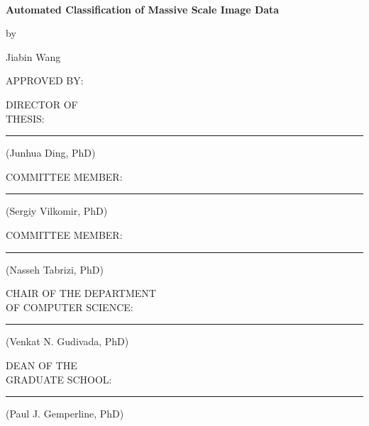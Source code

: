 
\hbox{\ }
\thispagestyle{empty}
\renewcommand{\baselinestretch}{2}
\small \normalsize
\begin{center}
\textbf{Automated Classification of Massive Scale Image Data}
\end{center}
\begin{center}
by
\end{center}
\begin{center}
Jiabin Wang
\end{center}
 
\begin{flushleft}
APPROVED BY:
\end{flushleft}
DIRECTOR OF\\ 
THESIS:
\noindent\rule{14cm}{0.4pt}
\begin{flushright}
\renewcommand{\baselinestretch}{0}
\small\normalsize
(Junhua Ding, PhD)
\end{flushright}
COMMITTEE MEMBER: 
\noindent\rule{10.75cm}{0.4pt}
\begin{flushright}
\renewcommand{\baselinestretch}{0}
\small\normalsize
(Sergiy Vilkomir, PhD)
\end{flushright}
COMMITTEE MEMBER: 
\noindent\rule{10.75cm}{0.4pt}
\begin{flushright}
\renewcommand{\baselinestretch}{0}
\small\normalsize
(Nasseh Tabrizi, PhD)
\end{flushright}
CHAIR OF THE DEPARTMENT\\ 
OF COMPUTER SCIENCE:
\noindent\rule{10.4cm}{0.4pt}
\begin{flushright}
\renewcommand{\baselinestretch}{0}
\small\normalsize
(Venkat N. Gudivada, PhD)
\end{flushright}
DEAN OF THE\\ 
GRADUATE SCHOOL: 
\noindent\rule{11.3cm}{0.4pt}
\begin{flushright}
\renewcommand{\baselinestretch}{0}
\small\normalsize
(Paul J. Gemperline, PhD)
\end{flushright}
	
